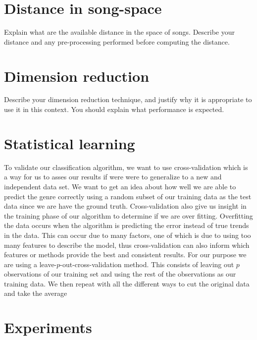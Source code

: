 \documentclass[12pt]{article}
\begin{document}
\section{Distance in song-space}
Explain what are the available distance in the space of songs.
Describe your distance and any pre-processing performed before
computing the distance.
\section{Dimension reduction}
Describe your dimension reduction technique, and justify why it 
is appropriate to use it in this context. You should explain what 
performance is expected.
\section{Statistical learning}
To validate our classification algorithm, we want to use cross-validation which is a way for us to asses our results if were were to generalize to a new and independent data set. We want to get an idea about how well we are able to predict the genre correctly using a random subset of our training data as the test data since we are have the ground truth. Cross-validation also give us insight in the training phase of our algorithm to determine if we are over fitting. Overfitting the data occurs when the algorithm is predicting the error instead of true trends in the data. This can occur due to many factors, one of which is due to using too many features to describe the model, thus cross-validation can also inform which features or methods provide the best and consistent results. For our purpose we are using a leave-$p$-out-cross-validation method. This consists of leaving out $p$ observations of our training set and using the rest of the observations as our training data. We then repeat with all the different ways to cut the original data and take the average  
\section{Experiments}
\end{document}
